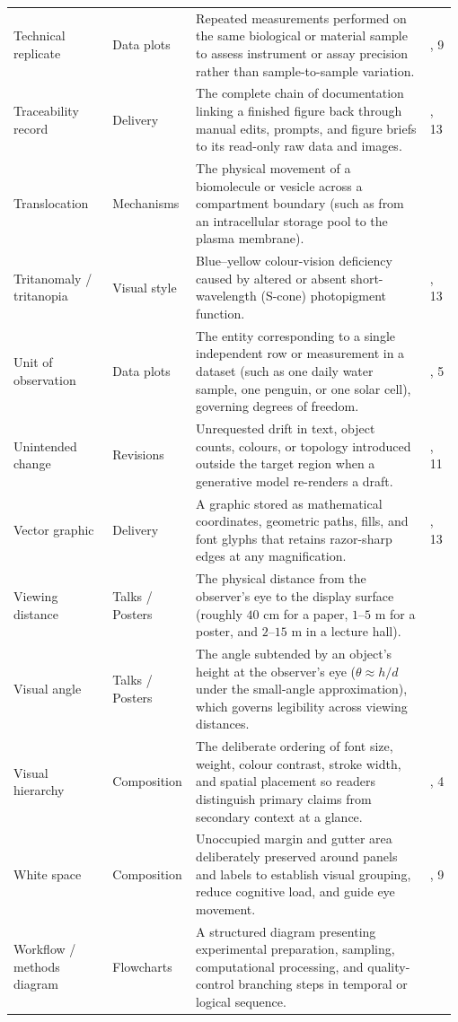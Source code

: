\begin{longtable}{@{}>{\raggedright\arraybackslash}p{0.22\linewidth}>{\raggedright\arraybackslash}p{0.18\linewidth}>{\raggedright\arraybackslash}p{0.52\linewidth}>{\raggedright\arraybackslash}p{0.06\linewidth}@{}}
Technical replicate & Data plots & Repeated measurements performed on the same biological or material sample to assess instrument or assay precision rather than sample-to-sample variation. & 5, 9 \\
Traceability record & Delivery & The complete chain of documentation linking a finished figure back through manual edits, prompts, and figure briefs to its read-only raw data and images. & 1, 13 \\
Translocation & Mechanisms & The physical movement of a biomolecule or vesicle across a compartment boundary (such as from an intracellular storage pool to the plasma membrane). & 7 \\
Tritanomaly / tritanopia & Visual style & Blue--yellow colour-vision deficiency caused by altered or absent short-wavelength (S-cone) photopigment function. & 4, 13 \\
Unit of observation & Data plots & The entity corresponding to a single independent row or measurement in a dataset (such as one daily water sample, one penguin, or one solar cell), governing degrees of freedom. & 1, 5 \\
Unintended change & Revisions & Unrequested drift in text, object counts, colours, or topology introduced outside the target region when a generative model re-renders a draft. & 3, 11 \\
Vector graphic & Delivery & A graphic stored as mathematical coordinates, geometric paths, fills, and font glyphs that retains razor-sharp edges at any magnification. & 6, 13 \\
Viewing distance & Talks / Posters & The physical distance from the observer's eye to the display surface (roughly $40\text{ cm}$ for a paper, $1\text{--}5\text{ m}$ for a poster, and $2\text{--}15\text{ m}$ in a lecture hall). & 12 \\
Visual angle & Talks / Posters & The angle subtended by an object's height at the observer's eye ($\theta \approx h/d$ under the small-angle approximation), which governs legibility across viewing distances. & 12 \\
Visual hierarchy & Composition & The deliberate ordering of font size, weight, colour contrast, stroke width, and spatial placement so readers distinguish primary claims from secondary context at a glance. & 3, 4 \\
White space & Composition & Unoccupied margin and gutter area deliberately preserved around panels and labels to establish visual grouping, reduce cognitive load, and guide eye movement. & 3, 9 \\
Workflow / methods diagram & Flowcharts & A structured diagram presenting experimental preparation, sampling, computational processing, and quality-control branching steps in temporal or logical sequence. & 6 \\
\end{longtable}
\endgroup

